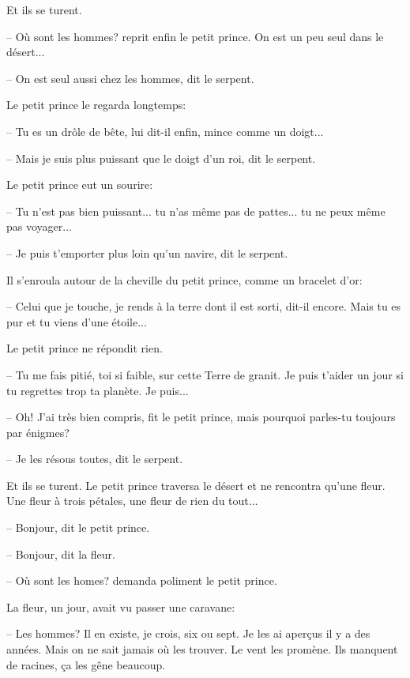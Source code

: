 \documentclass[a4paper]{report}
\begin{document}
Et ils se turent.

-- Où sont les hommes? reprit enfin le petit prince. On est un peu seul dans le désert...

-- On est seul aussi chez les hommes, dit le serpent.

Le petit prince le regarda longtemps:


-- Tu es un drôle de bête, lui dit-il enfin, mince comme un doigt...

-- Mais je suis plus puissant que le doigt d'un roi, dit le serpent.

Le petit prince eut un sourire:

-- Tu n'est pas bien puissant... tu n'as même pas de pattes... tu ne peux même pas voyager...

-- Je puis t'emporter plus loin qu'un navire, dit le serpent.

Il s'enroula autour de la cheville du petit prince, comme un bracelet d'or:

-- Celui que je touche, je rends à la terre dont il est sorti, dit-il encore. Mais tu es pur et tu viens d'une étoile...

Le petit prince ne répondit rien.

-- Tu me fais pitié, toi si faible, sur cette Terre de granit. Je puis t'aider un jour si tu regrettes trop ta planète. Je puis...

-- Oh! J'ai très bien compris, fit le petit prince, mais pourquoi parles-tu toujours par énigmes?

-- Je les résous toutes, dit le serpent.

Et ils se turent.
\parachapter[XVIII]{} %
Le petit prince traversa le désert et ne rencontra qu'une fleur. Une fleur à trois pétales, une fleur de rien du tout...


-- Bonjour, dit le petit prince.

-- Bonjour, dit la fleur.

-- Où sont les homes? demanda poliment le petit prince.

La fleur, un jour, avait vu passer une caravane:

-- Les hommes? Il en existe, je crois, six ou sept. Je les ai aperçus il y a des années. Mais on ne sait jamais où les trouver. Le vent les promène. Ils manquent de racines, ça les gêne beaucoup.
\end{document}
